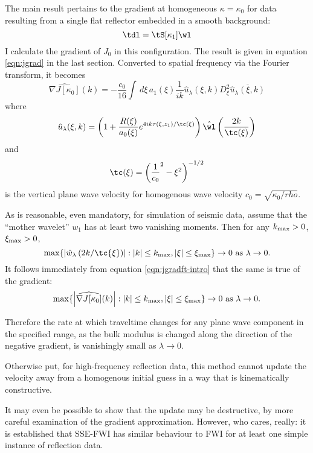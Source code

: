 The main result pertains to the gradient at homogeneous
$\kappa=\kappa_0$ for data resulting from a single flat reflector
embedded in a smooth background:
\[
\tdl = \tS[\kappa_1]\wl
\]
I calculate the gradient of $J_0$ in this configuration.
The result is given in equation \ref{eqn:jgrad} in the last
section. Converted to spatial frequency via the Fourier transform, it
becomes
\begin{equation}
\label{eqn:jgradft-intro}
\widehat{\nabla J[\kappa_0]}(k) = -\frac{c_0}{16}\int\, d\xi\,a_1(\xi) 
\frac{1}{ik}\hat{u}_{\lambda}(\xi,k)D_{\xi}^2\overline{\hat{u}_{\lambda}(\xi,k)}
\end{equation}
where
\[
\hat{u}_{\lambda}(\xi,k) = \left(1 +
  \frac{R(\xi)}{a_0(\xi)}e^{4ik\tau(\xi,z_1)/\tc(\xi)}\right)\hat{\wl}\left(\frac{2k}{\tc(\xi)}\right) 
\]
and 
\[
\tc(\xi) = \left(\frac{1}{c_0}^2-\xi^2\right)^{-1/2}
\]
is the vertical plane wave velocity for homogenous wave velocity
$c_0 = \sqrt{\kappa_0/rho}$.

As is reasonable, even mandatory, for simulation of seismic data,
assume that the ``mother wavelet'' $w_1$ has at least two vanishing
moments. Then for any $k_{\rm max} >0$, $\xi_{\rm max} > 0$,
\[
\max \{\left|\hat{w}_{\lambda}\left(2k/\tc{\xi}\right)\right|:
|k|\le k_{\rm max}, |\xi|\le \xi_{\rm max} \} \rightarrow 0\mbox{ as }
\lambda \rightarrow 0.
\]
It follows immediately from equation \ref{eqn:jgradft-intro} that the
same is true of the gradient:
\begin{equation}
\label{eqn:bigdeal}
\max \{\left|\widehat{\nabla J[\kappa_0]}(k)\right|:
|k|\le k_{\rm max}, |\xi|\le \xi_{\rm max} \} \rightarrow 0\mbox{ as }
\lambda \rightarrow 0.
\end{equation}

Therefore the rate at which traveltime changes for any plane wave
component in the specified range, as the bulk modulus is changed along
the direction of the negative gradient, is vanishingly small as
$\lambda \rightarrow 0$. 

Otherwise put, for high-frequency reflection data, this method cannot
update the velocity away from a homogenous initial guess in a way that
is kinematically constructive.

It may even be possible to show that the update may be destructive, by
more careful examination of the gradient approximation. However, who
cares, really: it is established that SSE-FWI has similar behaviour to
FWI for at least one simple instance of reflection data.

